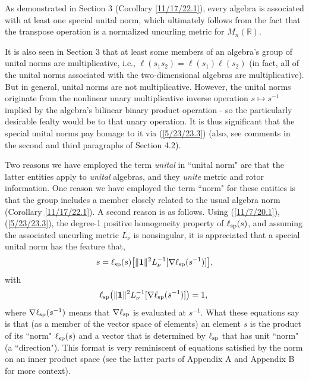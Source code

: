 \documentclass{amsart}
\numberwithin{equation}{section}
\theoremstyle{definition}
\numberwithin{theorem}{section}
\begin{document}
As demonstrated in Section 3 (Corollary \ref{11/17/22.1}), every algebra is associated with at least one special unital norm, which ultimately follows from the fact that the transpose operation is a normalized uncurling metric for $M_n(\mathbb{R})$.

It is also seen in Section 3 that at least some members of an algebra's group of unital norms are multiplicative, i.e., $\ell(s_1s_2) = \ell(s_1)\ell(s_2)$ (in fact, all of the unital norms associated with the two-dimensional algebras are multiplicative).   But in general, unital norms are not multiplicative.  However, the unital norms originate from the nonlinear unary multiplicative inverse operation $s\mapsto s^{-1}$ implied by the algebra's bilinear binary product operation - so the particularly desirable fealty would be to that unary operation.  It is thus significant that the special unital norms pay homage to it via (\ref{5/23/23.3}) (also, see comments in the second and third paragraphs of Section 4.2).

Two reasons we have employed the term {\it unital} in ``unital norm" are that the latter entities apply to {\it unital} algebras, and they {\it unite} metric and rotor information.  One reason we have employed the term ``norm" for these entities is that the group includes a member closely related to the usual algebra norm (Corollary \ref{11/17/22.1}).  A second reason is as follows.   Using (\ref{11/7/20.1}), (\ref{5/23/23.3}), the degree-1 positive homogeneity property of $\ell_{\rm sp}(s)$, and assuming the associated uncurling metric $L_\nu$ is nonsingular, it is appreciated that a special unital norm has the feature that,
\begin{equation}\label{5/22/24.5}  s = \ell_{\rm sp}(s)\big[\|\mathbf{1}\|^2 L_{\nu}^{-1}[\nabla\ell_{\rm sp}(s^{-1})]\big],\end{equation} with
\begin{equation}\label{5/22/24.6}\ell_{\rm sp}\big(\|\mathbf{1}\|^2 L_{\nu}^{-1}[\nabla\ell_{\rm sp}(s^{-1})]\big) = 1,\,\end{equation}
where $\nabla\ell_{\rm sp}(s^{-1})$ means that $\nabla\ell_{\rm sp}$ is evaluated at $s^{-1}$.  What these equations say is that (as a member of the vector space of elements) an element $s$ is the product of its ``norm" $\ell_{\rm sp}(s)$ and a vector that is determined by $\ell_{\rm sp}$ that has unit ``norm" (a ``direction").  This format is very reminiscent of equations satisfied by the norm on an inner product space (see the latter parts of Appendix A and Appendix B for more context).
\end{document}
